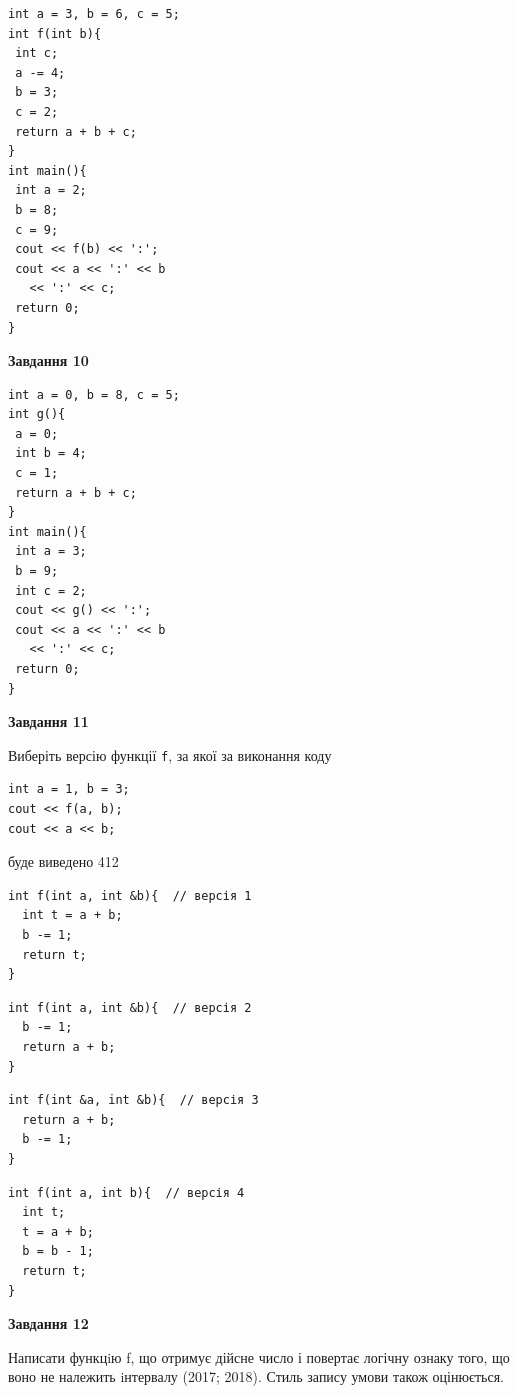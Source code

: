 \documentclass[12pt, ukrainian]{article}
\def\code#1{\Verb!#1!}
\begin{document}
{\begin {large}
\begin{minipage}[t]{7.0cm}
\begin{verbatim}
int a = 3, b = 6, c = 5;
int f(int b){
 int c;
 a -= 4;
 b = 3;
 c = 2;
 return a + b + c;
}
int main(){
 int a = 2;
 b = 8;
 c = 9;
 cout << f(b) << ':';
 cout << a << ':' << b 
   << ':' << c;
 return 0;
}
\end{verbatim}



\begin{center}
\textbf{Завдання 10}
\end{center}
\vspace{-8mm}

\begin{verbatim}
int a = 0, b = 8, c = 5;
int g(){
 a = 0;
 int b = 4;
 c = 1;
 return a + b + c;
}
int main(){
 int a = 3;
 b = 9;
 int c = 2;
 cout << g() << ':';
 cout << a << ':' << b 
   << ':' << c;
 return 0;
}
\end{verbatim}

\end{minipage}
\vline \hspace{1mm}
\begin{minipage}[t]{11.0cm}

\begin{center}
\textbf{Завдання 11}
\end{center}
Виберіть версію функції \code{f}, за якої за виконання коду
\begin{verbatim}
int a = 1, b = 3;
cout << f(a, b);
cout << a << b;
\end{verbatim}

буде виведено 412

\begin{verbatim}
int f(int a, int &b){  // версія 1
  int t = a + b;
  b -= 1;
  return t;
}
\end{verbatim}

\vspace{-8mm}\begin{verbatim}
int f(int a, int &b){  // версія 2
  b -= 1;
  return a + b;
}
\end{verbatim}

\vspace{-8mm}\begin{verbatim}
int f(int &a, int &b){  // версія 3
  return a + b;
  b -= 1;
}
\end{verbatim}

\vspace{-8mm}\begin{verbatim}
int f(int a, int b){  // версія 4
  int t;
  t = a + b;
  b = b - 1;
  return t;
}
\end{verbatim}



\begin{center}
\textbf{Завдання 12}
\end{center}

Написати функцiю f, що отримує дійсне число і повертає логічну ознаку того, що воно не належить iнтервалу (2017; 2018). Стиль запису умови також оцінюється.\par

\end{minipage}

\end {large}}
\end{document}
